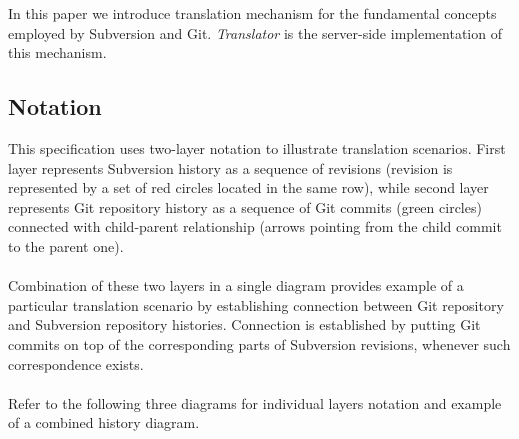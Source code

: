 \renewcommand{\figurename}{Diagram}
In this paper we introduce translation mechanism for the fundamental concepts employed by Subversion and Git.
\emph{Translator} is the server-side implementation of this mechanism.
\subsection{Notation}
This specification uses two-layer notation to illustrate translation scenarios. First layer represents 
Subversion history as a sequence of revisions (revision is represented by a set of red circles located in the same row), while second layer represents Git repository history
as a sequence of Git commits (green circles) connected with child-parent relationship (arrows pointing from the child 
commit to the parent one). 
\\\\
Combination of these two layers in a single diagram provides example of a particular translation scenario by
establishing connection between Git repository and Subversion repository histories. Connection is established
by putting Git commits on top of the corresponding parts of Subversion revisions, whenever such correspondence exists.
\\\\
Refer to the following three diagrams for individual layers notation and example of a combined history diagram.
